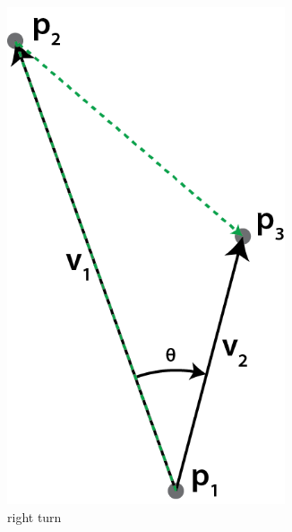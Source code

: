\begin{figure}
\begin{subfigure}[b]{0.3\textwidth}
		\includegraphics[width=0.9\textwidth]{./img/b_rightTurn}
		\caption{right turn}
		\label{subfig:b:RightTurn}
	\end{subfigure}	
	\begin{subfigure}[b]{0.3\textwidth}
		\centering

\end{subfigure}
\end{figure}
